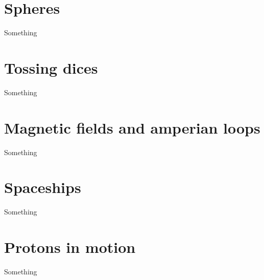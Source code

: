 \section{Spheres}
\label{sec:speheres}
Something

\section{Tossing dices}
\label{sec:dices}
Something

\section{Magnetic fields and amperian loops}
\label{sec:magnamp}
Something

\section{Spaceships}
\label{sec:spaceship}
Something

\section{Protons in motion}
\label{sec:protons}
Something
